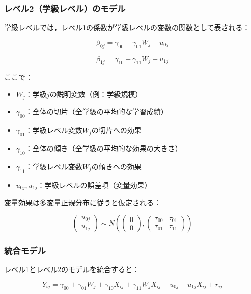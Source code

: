 \documentclass[
  a4paper,
]{ltjsbook}
\providecommand{\tightlist}{%
  \setlength{\itemsep}{0pt}\setlength{\parskip}{0pt}}
\begin{document}
\subsubsection{レベル2（学級レベル）のモデル}\label{ux30ecux30d9ux30eb2ux5b66ux7d1aux30ecux30d9ux30ebux306eux30e2ux30c7ux30eb}

学級レベルでは，レベル1の係数が学級レベルの変数の関数として表される：

\[
\beta_{0j} = \gamma_{00} + \gamma_{01}W_j + u_{0j}
\]

\[
\beta_{1j} = \gamma_{10} + \gamma_{11}W_j + u_{1j}
\]

ここで：

\begin{itemize}
\tightlist
\item
  \(W_j\)：学級\(j\)の説明変数（例：学級規模）
\item
  \(\gamma_{00}\)：全体の切片（全学級の平均的な学習成績）
\item
  \(\gamma_{01}\)：学級レベル変数\(W_j\)の切片への効果
\item
  \(\gamma_{10}\)：全体の傾き（全学級の平均的な効果の大きさ）
\item
  \(\gamma_{11}\)：学級レベル変数\(W_j\)の傾きへの効果
\item
  \(u_{0j}, u_{1j}\)：学級レベルの誤差項（変量効果）
\end{itemize}

変量効果は多変量正規分布に従うと仮定される：

\[
\begin{pmatrix} u_{0j} \\ u_{1j} \end{pmatrix} \sim N\left( \begin{pmatrix} 0 \\ 0 \end{pmatrix}, \begin{pmatrix} \tau_{00} & \tau_{01} \\ \tau_{01} & \tau_{11} \end{pmatrix} \right)
\]

\subsubsection{統合モデル}\label{ux7d71ux5408ux30e2ux30c7ux30eb}

レベル1とレベル2のモデルを統合すると：

\[
Y_{ij} = \gamma_{00} + \gamma_{01}W_j + \gamma_{10}X_{ij} + \gamma_{11}W_j X_{ij} + u_{0j} + u_{1j}X_{ij} + r_{ij}
\]
\end{document}
